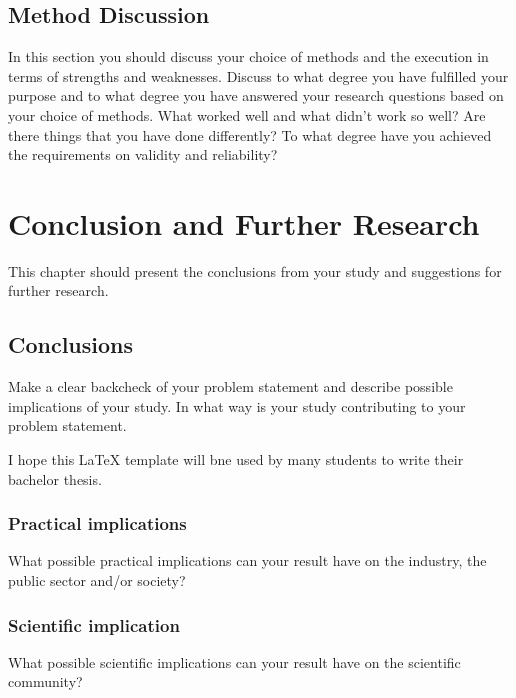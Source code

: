 \documentclass[a4paper, 12pt]{report}
\begin{document}
\medskip\lipsum[1]

\section{Method Discussion}

\textcolor{jupurple}{
In this section you should discuss your choice of methods and the execution in terms of strengths and weaknesses. Discuss to what degree you have fulfilled your purpose and to what degree you have answered your research questions based on your choice of methods. What worked well and what didn’t work so well? Are there things that you have done differently? To what degree have you achieved the requirements on validity and reliability?
}

\medskip\lipsum[1]


\chapter{Conclusion and Further Research}
\label{sec:conclusion}

\textcolor{jupurple}{
This chapter should present the conclusions from your study and suggestions for further research.
}

\section{Conclusions}

\textcolor{jupurple}{
Make a clear backcheck of your problem statement and describe possible implications of your study. In what way is your study contributing to your problem statement.
}

\medskip
I hope this LaTeX template will bne used by many students to write their bachelor thesis.

\subsection{Practical implications}

\textcolor{jupurple}{
What possible practical implications can your result have on the industry, the public sector and/or society?
}

\subsection{Scientific implication}

\textcolor{jupurple}{
What possible scientific implications can your result have on the scientific community?
}
\end{document}
